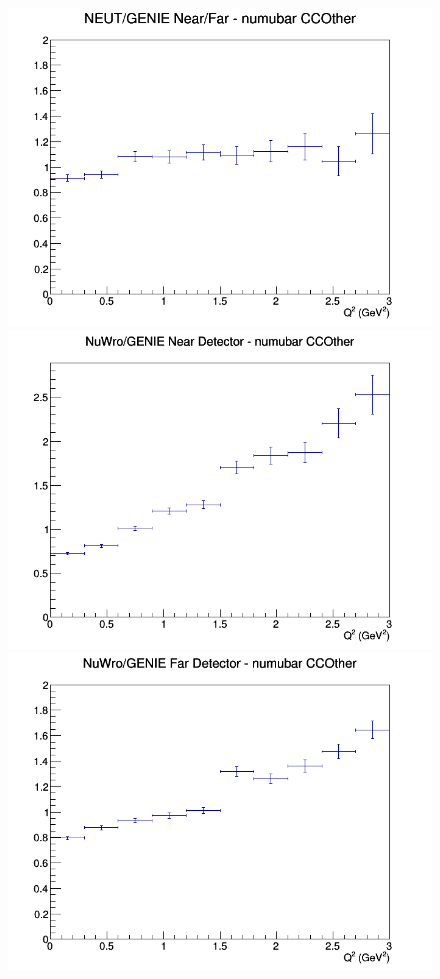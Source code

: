 \begin{figure}[h]
\endminipage
{}
\includegraphics[width=\linewidth]{eff_Q2/GAr/ratios/CCOther_NEUT_GENIE_numubar_NF_Q2.png}
\endminipage
\newline
{}
\includegraphics[width=\linewidth]{eff_Q2/GAr/ratios/CCOther_NuWro_GENIE_numubar_near_Q2.png}
\endminipage
{}
\includegraphics[width=\linewidth]{eff_Q2/GAr/ratios/CCOther_NuWro_GENIE_numubar_far_Q2.png}

\end{figure}

